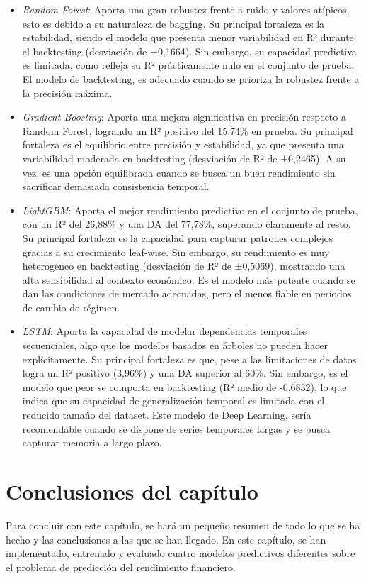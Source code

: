 \begin{itemize}
    \item \emph{Random Forest}: Aporta una gran robustez frente a ruido y valores atípicos, esto es debido a su naturaleza de bagging. Su principal fortaleza es la estabilidad, siendo el modelo que presenta menor variabilidad en R² durante el backtesting (desviación de ±0,1664). Sin embargo, su capacidad predictiva es limitada, como refleja su R² prácticamente nulo en el conjunto de prueba. El modelo de backtesting, es adecuado cuando se prioriza la robustez frente a la precisión máxima.
    \item \emph{Gradient Boosting}: Aporta una mejora significativa en precisión respecto a Random Forest, logrando un R² positivo del 15,74\% en prueba. Su principal fortaleza es el equilibrio entre precisión y estabilidad, ya que presenta una variabilidad moderada en backtesting (desviación de R² de ±0,2465). A su vez, es una opción equilibrada cuando se busca un buen rendimiento sin sacrificar demasiada consistencia temporal.
    \item \emph{LightGBM}: Aporta el mejor rendimiento predictivo en el conjunto de prueba, con un R² del 26,88\% y una DA del 77,78\%, superando claramente al resto. Su principal fortaleza es la capacidad para capturar patrones complejos gracias a su crecimiento leaf-wise. Sin embargo, su rendimiento es muy heterogéneo en backtesting (desviación de R² de ±0,5069), mostrando una alta sensibilidad al contexto económico. Es el modelo más potente cuando se dan las condiciones de mercado adecuadas, pero el menos fiable en períodos de cambio de régimen.
    \item \emph{LSTM}: Aporta la capacidad de modelar dependencias temporales secuenciales, algo que los modelos basados en árboles no pueden hacer explícitamente. Su principal fortaleza es que, pese a las limitaciones de datos, logra un R² positivo (3,96\%) y una DA superior al 60\%. Sin embargo, es el modelo que peor se comporta en backtesting (R² medio de -0,6832), lo que indica que su capacidad de generalización temporal es limitada con el reducido tamaño del dataset. Este modelo de Deep Learning, sería  recomendable cuando se dispone de series temporales largas y se busca capturar memoria a largo plazo.
\end{itemize}

\section{Conclusiones del capítulo}
\label{sec:conclusiones_cap4}
Para concluir con este capítulo, se hará un pequeño resumen de todo lo que se ha hecho y las conclusiones a las que se han llegado. En este capítulo, se han implementado, entrenado y evaluado cuatro modelos predictivos diferentes sobre el problema de predicción del rendimiento financiero. 

